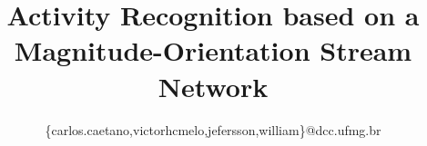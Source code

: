 \documentclass[10pt,conference]{IEEEtran}
\begin{document}
%
\title{Activity Recognition based on a Magnitude-Orientation Stream Network}
\newif\iffinal
\finaltrue
\newcommand{\jemsid}{92}
\newcommand{\todo}[1]{{\color{red}[\textbf{TODO: }#1]}}
\newcommand{\alterar}[1]{{\color{red}[\textbf{}#1]}}
\newcommand{\verify}{{\color{red} \textbf{[*verify*] }}}
\newcommand{\verified}{{\color{blue} \textbf{[*verified - ok*] }}}
\newcommand{\changed}[1]{{\color{blue}[\textbf{changed: }#1]}}


\iffinal



\author{
	\{carlos.caetano,victorhcmelo,jefersson,william\}@dcc.ufmg.br
}

\else
  \author{Sibgrapi paper ID: \jemsid \\ }
\fi


\maketitle
\end{document}

